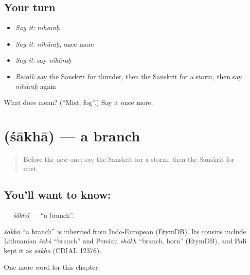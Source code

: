 \subsection*{Your turn}
\begin{itemize}
\raggedright
  \item \emph{Say it:} \emph{nīhāraḥ}
  \item \emph{Say it:} \emph{nīhāraḥ}, once more
  \item \emph{Say it:} say \emph{nīhāraḥ}
  \item \emph{Recall:} say the Sanskrit for thunder, then the Sanskrit for a storm, then say \emph{nīhāraḥ} again
\end{itemize}

\begin{tcolorbox}[breakable,colback=teal!4,colframe=teal!35!black,title={Before you move on}]
What does  mean? (\textquotedblleft{}Mist, fog\textquotedblright{}.) Say it once more.
\end{tcolorbox}
\section[\texorpdfstring{\sk{शाखा} (śākhā)}{शाखा (śākhā)}]{ (śākhā) — a branch}

\label{lesson:SA-C111-sakha}



\begin{quote}
Before the new one: say the Sanskrit for a storm, then the Sanskrit for mist.
\end{quote}

\subsection*{You'll want to know: }
\textbf{} — \emph{śākhā} — \textquotedblleft{}a branch\textquotedblright{}.

\begin{cousinweb}
\emph{śākhā} \textquotedblleft{}a branch\textquotedblright{} is inherited from Indo-European (EtymDB). Its cousins include Lithuanian \emph{šakà} \textquotedblleft{}branch\textquotedblright{} and Persian \emph{shākh} \textquotedblleft{}branch, horn\textquotedblright{} (EtymDB), and Pali kept it as \emph{sākhā} (CDIAL 12376).
\end{cousinweb}

\begin{grammarlens}[title={What you've built}]
One more word for this chapter.
\end{grammarlens}

